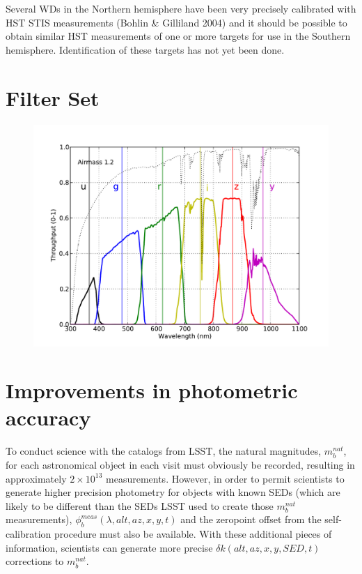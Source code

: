 \documentclass[12pt,preprint]{aastex}
\begin{document}
Several WDs in the Northern hemisphere have been very precisely
calibrated with HST STIS measurements (Bohlin \& Gilliland 2004) and
it should be possible to obtain similar HST measurements of one or
more targets for use in the Southern hemisphere. Identification of
these targets has not yet been done. 







\appendix

\newpage
\section{Filter Set}

\begin{figure}[h!]
\includegraphics[width=5in]{filters}
\end{figure}


\section{Improvements in photometric accuracy}
\label{sec:photo_better}

To conduct science with the catalogs from LSST, the natural
magnitudes, $m_b^{nat}$, for each astronomical object in each visit
must obviously be recorded, resulting in approximately
$2\times10^{13}$ measurements. However, in order to permit scientists
to generate higher precision photometry for objects with known SEDs
(which are likely to be different than the SEDs LSST used to create
those $m_b^{nat}$ measurements), $\phi_b^{meas}(\lambda,alt,az,x,y,t)$
and the zeropoint offset from the self-calibration procedure must also
be available. With these additional pieces of information, scientists
can generate more precise $\delta k(alt,az,x,y,SED,t)$ corrections to
$m_b^{nat}$.
\end{document}
